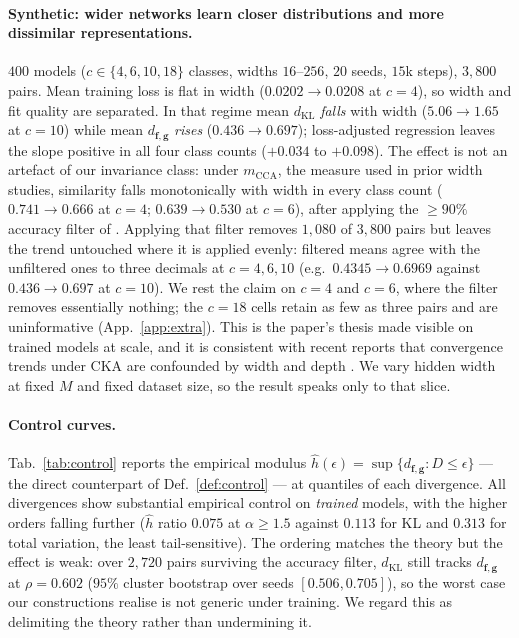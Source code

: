 \documentclass[10pt,letterpaper,twocolumn]{article}
\newcommand{\bff}{\mathbf{f}}
\newcommand{\bfg}{\mathbf{g}}
\newcommand{\dKL}{d_{\mathrm{KL}}}
\newcommand{\dfg}{d_{\bff,\bfg}}
\newcommand{\mCCA}{m_{\mathrm{CCA}}}
\theoremstyle{plain}
\theoremstyle{definition}
\theoremstyle{remark}
\begin{document}
\paragraph{Synthetic: wider networks learn closer distributions and more
dissimilar representations.}
$400$ models ($c\in\{4,6,10,18\}$ classes, widths $16$--$256$, $20$ seeds,
$15$k steps), $3{,}800$ pairs. Mean training loss is flat in width
($0.0202\to0.0208$ at $c{=}4$), so width and fit quality are separated. In that
regime mean $\dKL$ \emph{falls} with width ($5.06\to1.65$ at $c{=}10$) while
mean $\dfg$ \emph{rises} ($0.436\to0.697$); loss-adjusted regression leaves the
slope positive in all four class counts ($+0.034$ to $+0.098$). The effect is
not an artefact of our invariance class: under $\mCCA$, the measure used in
prior width studies, similarity falls monotonically with width in every class
count ($0.741\to0.666$ at $c{=}4$; $0.639\to0.530$ at $c{=}6$), after applying
the $\ge90\%$ accuracy filter of \citet{roeder2021}. Applying that filter removes $1{,}080$ of $3{,}800$ pairs but leaves the trend
untouched where it is applied evenly: filtered means agree with the unfiltered
ones to three decimals at $c{=}4,6,10$ (e.g.\ $0.4345\to0.6969$ against
$0.436\to0.697$ at $c{=}10$). We rest the claim on $c{=}4$ and $c{=}6$, where
the filter removes essentially nothing; the $c{=}18$ cells retain as few as
three pairs and are uninformative (App.~\ref{app:extra}). This is the paper's thesis made visible
on trained models at scale, and it is consistent with recent reports that
convergence trends under CKA are confounded by width and depth
\citep{aristotelian2026,platoscave2026,structure2026}. We vary hidden width at
fixed $M$ and fixed dataset size, so the result speaks only to that slice.

\paragraph{Control curves.}
Tab.~\ref{tab:control} reports the empirical modulus
$\hat h(\epsilon)=\sup\{\dfg:D\le\epsilon\}$ --- the direct counterpart of
Def.~\ref{def:control} --- at quantiles of each divergence. All divergences
show substantial empirical control on \emph{trained} models, with the higher
orders falling further ($\hat h$ ratio $0.075$ at $\alpha\ge1.5$ against
$0.113$ for KL and $0.313$ for total variation, the least tail-sensitive). The
ordering matches the theory but the effect is weak: over $2{,}720$ pairs
surviving the accuracy filter, $\dKL$ still tracks $\dfg$ at
$\rho=0.602$ ($95\%$ cluster bootstrap over seeds $[0.506,0.705]$), so the
worst case our constructions realise is not generic under training. We regard this as
delimiting the theory rather than undermining it.
\end{document}
